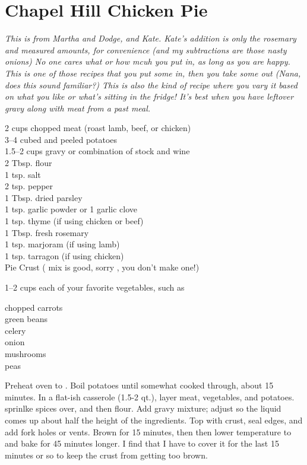 \section{Chapel Hill Chicken Pie}

\textit{This is from Martha and Dodge, and Kate. Kate's  addition is 
only the
rosemary and measured amounts, for convenience (and my subtractions are those
nasty onions) No one cares what or how mcuh you put in, as long as you are happy.
This is one of those recipes that you put some in, then you take some out (Nana,
does this sound familiar?) This is also the kind of recipe where you vary it
based on what you like or what's sitting in the fridge! It's best when you have
leftover gravy along with meat from a past meal.}
\begin{ingredients}
2 cups chopped meat (roast lamb, beef, or chicken)\\
3--4 cubed and peeled potatoes\\
1.5--2 cups gravy or combination of stock and wine\\
2 Tbsp. flour\\ 
1 tsp. salt\\
2 tsp. pepper\\
1 Tbsp. dried parsley\\
1 tsp. garlic powder or 1 garlic clove\\
1 tsp. thyme (if using chicken or beef)\\
1 Tbsp. fresh rosemary \\
1 tsp. marjoram (if using lamb)\\
1 tsp. tarragon (if using chicken)\\
Pie Crust ( mix is good, sorry 
, you don't make one!) 
\end{ingredients}
1--2 cups each of your favorite vegetables, such as  
\begin{ingredients}
chopped carrots\\ 
green beans\\
celery\\ 
onion\\
mushrooms\\
peas\\
\end{ingredients}
Preheat oven to . Boil potatoes until somewhat cooked through, about
15 minutes. In a flat-ish casserole (1.5-2 qt.), layer meat, vegetables, and
potatoes. sprinlke spices over, and then flour. Add gravy mixture; adjust so
the liquid comes up about half the height of the ingredients.  Top with crust,
seal edges, and add fork holes or vents. Brown for 15 minutes, then then lower
temperature to  and bake for 45 minutes longer. I find that I have to
cover it for the last 15 minutes or so to keep the crust from getting too brown.

